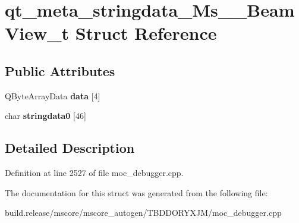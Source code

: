 \hypertarget{structqt__meta__stringdata___ms_____beam_view__t}{}\section{qt\+\_\+meta\+\_\+stringdata\+\_\+\+Ms\+\_\+\+\_\+\+Beam\+View\+\_\+t Struct Reference}
\label{structqt__meta__stringdata___ms_____beam_view__t}
\subsection*{Public Attributes}
\begin{DoxyCompactItemize}
\item 
\mbox{\label{structqt__meta__stringdata___ms_____beam_view__t_a9def3149bb9da4d44f3d81d267388d3e}} 
Q\+Byte\+Array\+Data {\bfseries data} \mbox{[}4\mbox{]}
\item 
\mbox{\label{structqt__meta__stringdata___ms_____beam_view__t_a05320a6722113f682c88ee694a82eb92}} 
char {\bfseries stringdata0} \mbox{[}46\mbox{]}
\end{DoxyCompactItemize}


\subsection{Detailed Description}


Definition at line 2527 of file moc\+\_\+debugger.\+cpp.



The documentation for this struct was generated from the following file\+:\begin{DoxyCompactItemize}
\item 
build.\+release/mscore/mscore\+\_\+autogen/\+T\+B\+D\+D\+O\+R\+Y\+X\+J\+M/moc\+\_\+debugger.\+cpp\end{DoxyCompactItemize}

